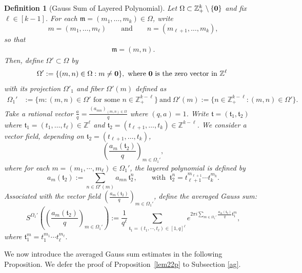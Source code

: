 \documentclass[10pt,a4paper]{amsart}
\newtheorem{definition}{Definition}\numberwithin{definition}{section}
\numberwithin{equation}{section}
\begin{document}
 \begin{definition}[Gauss Sum of Layered Polynomial]
 Let $\Omega\subset \mathbb{Z}_+^k \setminus \{{\bf 0}\}$ and fix $ \ell \in  [k-1]$. For each $\mathfrak{m}=(m_1,\ldots,m_k)\in\Omega$, write \[ m=(m_1,\ldots,m_\ell) \qquad\text{and}\qquad n=(m_{\ell+1},\ldots,m_k), \] so that \begin{align}\label{pf1} \mathfrak{m}=(m,n). \end{align}
Then, define $\Omega'\subset\Omega$ by
\begin{align*}
\Omega':=  
	\{ (m,n)\in\Omega: m\ne {\bf 0}\}, \ \text{where ${\bf 0}$ is the zero vector in $\mathbb{Z}^{\ell}$}\  
\end{align*}
with its projection
$\Omega'_{1}$ and fiber $\Omega'(m)$ defined as \begin{align*}
	\Omega_{1}' &:=\{m: (m,n)\in \Omega'\text{ for some } n\in\mathbb{Z}_{+}^{k-\ell}\} \ \text{and}\ \Omega'(m):= \{ n\in\mathbb Z_+^{k-\ell}: (m,n)\in \Omega' \}.
\end{align*}	Take a rational vector 
$
\frac{a}{q}=\frac{(a_{mn})_{(m,n)\in \Omega}}{q} 
$ where  $(q,a)=1$.  Write $\mathfrak{t}=(\mathfrak{t}_1,\mathfrak{t}_2)$ where $\mathfrak{t}_1=(t_{1},\dots,t_{\ell})\in \mathbb{Z}^{\ell}$ and $\mathfrak{t}_2=(t_{\ell+1},\dots,t_k)\in \mathbb{Z}^{k-\ell}$.
We consider a vector field, depending on $\mathfrak{t}_2=(t_{\ell+1},\dots,t_k)$,
\[
\left( \frac{a_{m}(\mathfrak{t}_2)}{q} \right)_{m\in \Omega_{1}'},
\]
where   for each $m=(m_1,\cdots,m_{\ell})\in \Omega_1'$,  the layered polynomial is defined by
\[
a_{m}(\mathfrak{t}_2):=\sum_{n \in \Omega'(m)} a_{mn}\,\mathfrak{t}_2^{n}, 
\qquad \text{with } \ \mathfrak{t}_2^n=t_{\ell+1}^{m_{\ell+1}}\cdots t_k^{m_k}.
\]
 Associated with the vector field  $\left( \frac{a_{m}(\mathfrak{t}_2)}{q} \right)_{m\in \Omega_{1}'}$,    define the averaged Gauss sum: $$S^{\Omega_{1}'}\left(\left( \frac{a_{m}(\mathfrak{t}_2)}{q} \right)_{m\in \Omega_{1}'}\right):= \frac{1}{q^\ell}\sum_{\mathfrak{t}_1= (t_1,\cdots,t_\ell)\in  [1,q]^{\ell}}e^{2\pi i \sum_{m\in\Omega_1' }  \frac{a_{m}(\mathfrak{t}_2)}{q}  \mathfrak{t}_1^{m}},$$  
where  $\mathfrak{t}_1^{m}=t_1^{m_1}\cdots t_\ell^{m_\ell}.$
\end{definition}






 We now introduce the averaged Gauss sum estimates in the following Proposition. We defer the proof of Proposition~\ref{lem22p}  to Subsection \ref{ag}.
 
\end{document}
